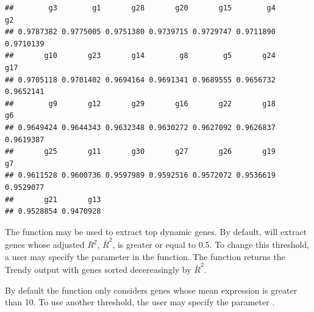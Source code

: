 \documentclass{article}
\begin{document}
\begin{knitrout}
\color{fgcolor}\begin{kframe}
\begin{alltt}
 \hlkwb{<-} \hlstd{(}   \hlstd{=} \hlstd{)}
\end{alltt}


{\ttfamily\noindent\color{warningcolor}{\#\# Warning in trendy(Data = TrendyExampleData, maxK = 2): No values for parameter tVectIn were given. \\\#\#\ \ \ \ \ \ \ \  Trendy will assume data goes from 1:40}}\begin{alltt}
 \hlkwb{<-} 
 \hlkwb{<-} 
\hlopt{$}
\end{alltt}
\begin{verbatim}
##        g3        g1       g28       g20       g15        g4        g2 
## 0.9787382 0.9775005 0.9751380 0.9739715 0.9729747 0.9711890 0.9710139 
##       g10       g23       g14        g8        g5       g24       g17 
## 0.9705118 0.9701402 0.9694164 0.9691341 0.9689555 0.9656732 0.9652141 
##        g9       g12       g29       g16       g22       g18        g6 
## 0.9649424 0.9644343 0.9632348 0.9630272 0.9627092 0.9626837 0.9619387 
##       g25       g11       g30       g27       g26       g19        g7 
## 0.9611528 0.9600736 0.9597989 0.9592516 0.9572072 0.9536619 0.9529077 
##       g21       g13 
## 0.9528854 0.9470928
\end{verbatim}
\end{kframe}
\end{knitrout}

The  function may be used to extract top dynamic genes.
By default,  will extract genes whose adjusted 
$R^2$, $\bar{R}^{2}$,
is greater or equal to 0.5. To change this threshold, a user may specify the
 parameter in the  function. The 
 function returns
the Trendy output with genes sorted decereasingly by $\bar{R}^{2}$.


By default the  function only considers genes whose mean 
expression is greater than 10.
To use another threshold, the user may specify the parameter 
.
\end{document}
